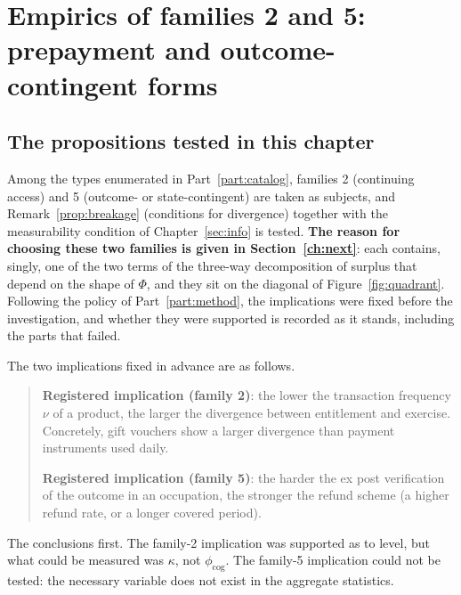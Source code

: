 \chapter{Empirics of families 2 and 5: prepayment and outcome-contingent forms}


\section{The propositions tested in this chapter}

Among the types enumerated in Part~\ref{part:catalog}, families 2 (continuing access) and 5
(outcome- or state-contingent) are taken as subjects, and Remark~\ref{prop:breakage} (conditions
for divergence) together with the measurability condition of Chapter~\ref{sec:info} is tested.
\textbf{The reason for choosing these two families is given in Section~\ref{ch:next}}: each
contains, singly, one of the two terms of the three-way decomposition of surplus that depend on
the shape of $\Phi$, and they sit on the diagonal of Figure~\ref{fig:quadrant}. Following the
policy of Part~\ref{part:method}, the implications were fixed before the investigation, and
whether they were supported is recorded as it stands, including the parts that failed.

The two implications fixed in advance are as follows.

\begin{quote}
\textbf{Registered implication (family 2)}: the lower the transaction frequency $\nu$ of a
product, the larger the divergence between entitlement and exercise. Concretely, gift vouchers
show a larger divergence than payment instruments used daily.

\textbf{Registered implication (family 5)}: the harder the ex post verification of the outcome in
an occupation, the stronger the refund scheme (a higher refund rate, or a longer covered period).
\end{quote}

The conclusions first. The family-2 implication was supported as to level, but what could be
measured was $\kappa$, not $\phi_{\mathrm{cog}}$. The family-5 implication could not be tested:
the necessary variable does not exist in the aggregate statistics.

